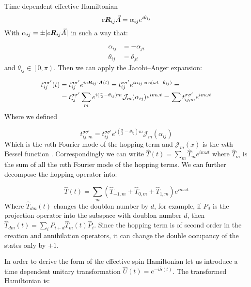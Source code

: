 \begin{section}{Time dependent effective Hamiltonian}
\begin{equation}
\label{Def_alpha}
e\boldsymbol{R}_{ij}\vec{A} = \alpha_{ij} e^{i \theta_{ij}}
\end{equation}
With $\alpha_{ij} = \pm|e\boldsymbol{R}_{ij}\vec{A}|$ in such a way that:

\begin{align}
\alpha_{ij} &= -\alpha_{ji} \label{alphaSym} \\
\theta_{ij} &= \theta_{ji} \label{thetaSym}
\end{align}
and $\theta_{ij} \in \left[0,\pi\right)$. Then we can apply the Jacobi–Anger expansion:

\begin{align*}
t_{ij}^{\sigma \sigma'}(t) &= t_{ij}^{\sigma \sigma'}e^{ie\boldsymbol{R}_{ij}\cdot\boldsymbol{A}(t)} = t_{ij}^{\sigma \sigma'}e^{i\alpha_{ij} \cos(\omega t - \theta_{ij})} = \\
&= t_{ij}^{\sigma \sigma'}\sum_m e^{i(\frac{\pi}{2}-\theta_{ij})m} \mathcal{J}_m(\alpha_{ij}) e^{im\omega t} = \sum t_{ij,m}^{\sigma \sigma'} e^{im\omega t}
\end{align*}
Where we defined 

\begin{equation}
\label{HoppAmpFourier}
t_{ij,m}^{\sigma \sigma'} = t_{ij}^{\sigma \sigma'} e^{i(\frac{\pi}{2}-\theta_{ij})m} \mathcal{J}_m(\alpha_{ij})
\end{equation}
Which is the \textit{m}th Fourier mode of the hopping term and $\mathcal{J}_m(x)$ is the \textit{m}th Bessel function \cite{Kitamura2017}. Correspondingly we can write $\hat{T}(t) = \sum_m \hat{T}_m e^{im \omega t}$ where $\hat{T}_m$ is the sum of all the \textit{m}th Fourier mode of the hopping terms. We can further decompose the hopping operator into:

\begin{equation}
\hat{T}(t) = \sum_m (\hat{T}_{-1,m}+\hat{T}_{0,m}+\hat{T}_{1,m})e^{im\omega t}
\end{equation}
Where $\hat{T}_{dm}(t)$ changes the doublon number by $d$, for example, if $\hat{P}_d$ is the projection operator into the subspace with doublon number $d$, then $\hat{T}_{dm}(t) = \sum_i \hat{P}_{i+d}\hat{T}_{m}(t)\hat{P}_i$. Since the hopping term is of second order in the creation and annihilation operators, it can change the double occupancy of the states only by $\pm1$.

In order to derive the form of the effective spin Hamiltonian let us introduce a time dependent unitary transformation $\hat{U}(t) = e^{-i\hat{S}(t)}$. The transformed Hamiltonian is:


\end{section}
